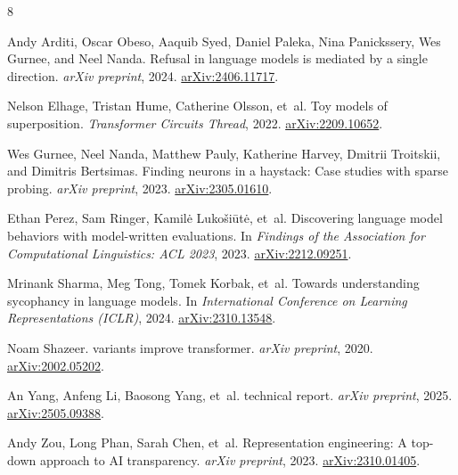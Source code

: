\documentclass[11pt, a4paper]{article}
\begin{document}
\begin{thebibliography}{8}
\small

Andy Arditi, Oscar Obeso, Aaquib Syed, Daniel Paleka, Nina Panickssery, Wes Gurnee, and Neel Nanda.
\newblock Refusal in language models is mediated by a single direction.
\newblock \emph{arXiv preprint}, 2024. \newblock \href{https://arxiv.org/abs/2406.11717}{arXiv:2406.11717}.

Nelson Elhage, Tristan Hume, Catherine Olsson, et~al.
\newblock Toy models of superposition.
\newblock \emph{Transformer Circuits Thread}, 2022. \newblock \href{https://arxiv.org/abs/2209.10652}{arXiv:2209.10652}.

Wes Gurnee, Neel Nanda, Matthew Pauly, Katherine Harvey, Dmitrii Troitskii, and Dimitris Bertsimas.
\newblock Finding neurons in a haystack: Case studies with sparse probing.
\newblock \emph{arXiv preprint}, 2023. \newblock \href{https://arxiv.org/abs/2305.01610}{arXiv:2305.01610}.

Ethan Perez, Sam Ringer, Kamil\.e Luko\v{s}i\={u}t\.e, et~al.
\newblock Discovering language model behaviors with model-written evaluations.
\newblock In \emph{Findings of the Association for Computational Linguistics: ACL 2023}, 2023. \newblock \href{https://arxiv.org/abs/2212.09251}{arXiv:2212.09251}.

Mrinank Sharma, Meg Tong, Tomek Korbak, et~al.
\newblock Towards understanding sycophancy in language models.
\newblock In \emph{International Conference on Learning Representations (ICLR)}, 2024. \newblock \href{https://arxiv.org/abs/2310.13548}{arXiv:2310.13548}.

Noam Shazeer.
 variants improve transformer.
\newblock \emph{arXiv preprint}, 2020. \newblock \href{https://arxiv.org/abs/2002.05202}{arXiv:2002.05202}.

An Yang, Anfeng Li, Baosong Yang, et~al.
 technical report.
\newblock \emph{arXiv preprint}, 2025. \newblock \href{https://arxiv.org/abs/2505.09388}{arXiv:2505.09388}.

Andy Zou, Long Phan, Sarah Chen, et~al.
\newblock Representation engineering: A top-down approach to {AI} transparency.
\newblock \emph{arXiv preprint}, 2023. \newblock \href{https://arxiv.org/abs/2310.01405}{arXiv:2310.01405}.

\end{thebibliography}
\end{document}
